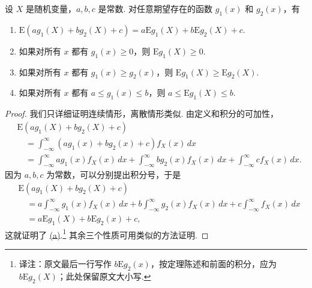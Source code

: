 \begin{theorem}\label{thm:2.2.5}
设 $X$ 是随机变量，$a,b,c$ 是常数. 对任意期望存在的函数 $g_1(x)$ 和 $g_2(x)$，有
\begin{enumerate}
\item[(a)]\label{itm:thm:2.2.5:a} $\mathrm E(ag_1(X)+bg_2(X)+c)=a\mathrm Eg_1(X)+b\mathrm Eg_2(X)+c$.
\item[(b)] 如果对所有 $x$ 都有 $g_1(x)\ge0$，则 $\mathrm Eg_1(X)\ge0$.
\item[(c)] 如果对所有 $x$ 都有 $g_1(x)\ge g_2(x)$，则 $\mathrm Eg_1(X)\ge\mathrm Eg_2(X)$.
\item[(d)] 如果对所有 $x$ 都有 $a\le g_1(x)\le b$，则 $a\le\mathrm Eg_1(X)\le b$.
\end{enumerate}
\end{theorem}
\begin{proof}
我们只详细证明连续情形，离散情形类似. 由定义和积分的可加性，
$$\begin{aligned}
&\mathrm E(ag_1(X)+bg_2(X)+c)\\
&\quad=\int_{-\infty}^\infty(ag_1(x)+bg_2(x)+c)f_X(x)\,dx\\
&\quad=\int_{-\infty}^\infty ag_1(x)f_X(x)\,dx
+\int_{-\infty}^\infty bg_2(x)f_X(x)\,dx+\int_{-\infty}^\infty cf_X(x)\,dx.
\end{aligned}$$
因为 $a,b,c$ 为常数，可以分别提出积分号，于是
$$\begin{aligned}
&\mathrm E(ag_1(X)+bg_2(X)+c)\\
&\quad=a\int_{-\infty}^\infty g_1(x)f_X(x)\,dx
+b\int_{-\infty}^\infty g_2(x)f_X(x)\,dx+c\int_{-\infty}^\infty f_X(x)\,dx\\
&\quad=a\mathrm Eg_1(X)+b\mathrm Eg_2(x)+c,
\end{aligned}$$
这就证明了 \hyperref[itm:thm:2.2.5:a]{(a)}.\footnote{译注：原文最后一行写作 $b\mathrm Eg_2(x)$，按定理陈述和前面的积分，应为 $b\mathrm Eg_2(X)$；此处保留原文大小写.} 其余三个性质可用类似的方法证明.
\end{proof}

